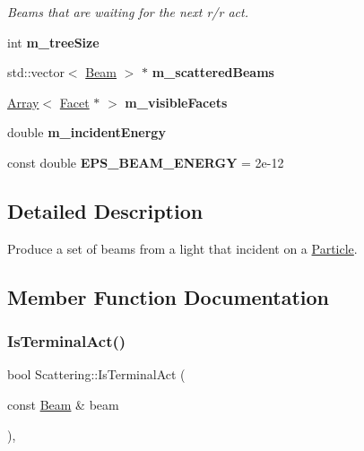 \begin{DoxyCompactItemize}
\begin{DoxyCompactList}\small\item\em Beams that are waiting for the next r/r act. \end{DoxyCompactList}\item 
\mbox{\label{class_scattering_adb62197742a6ee9e1b9c3e988a4a89ee}} 
int {\bfseries m\+\_\+tree\+Size}
\item 
\mbox{\label{class_scattering_ac35fa41714a7784304eead96b8186532}} 
std\+::vector$<$ \mbox{\hyperlink{class_beam}{Beam}} $>$ $\ast$ {\bfseries m\+\_\+scattered\+Beams}
\item 
\mbox{\label{class_scattering_a7a80cb232adf041261fe02811c5cdfd5}} 
\mbox{\hyperlink{class_array}{Array}}$<$ \mbox{\hyperlink{class_facet}{Facet}} $\ast$ $>$ {\bfseries m\+\_\+visible\+Facets}
\item 
\mbox{\label{class_scattering_a698c33191f5e87477b37b27e36bca0a2}} 
double {\bfseries m\+\_\+incident\+Energy}
\item 
\mbox{\label{class_scattering_a172f9184deb0e131762f21cd33a02788}} 
const double {\bfseries E\+P\+S\+\_\+\+B\+E\+A\+M\+\_\+\+E\+N\+E\+R\+GY} = 2e-\/12
\end{DoxyCompactItemize}


\subsection{Detailed Description}
Produce a set of beams from a light that incident on a \mbox{\hyperlink{class_particle}{Particle}}. 

\subsection{Member Function Documentation}
\mbox{\label{class_scattering_abe93cd1898e52b1601c96735020454fe}} 
\subsubsection{\texorpdfstring{Is\+Terminal\+Act()}{IsTerminalAct()}}
{\footnotesize\ttfamily bool Scattering\+::\+Is\+Terminal\+Act (\begin{DoxyParamCaption}\item[{const \mbox{\hyperlink{class_beam}{Beam}} \&}]{beam }\end{DoxyParamCaption})\hspace{0.3cm}{\ttfamily [protected]}, {\ttfamily [virtual]}}



